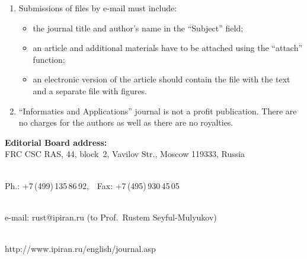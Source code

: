 {\begin{enumerate}[1.]
\item Submissions of files by e-mail must include:\\[-13.5pt]
\begin{itemize}
\item   the journal title and author's name in the ``Subject'' field; \\[-13.5pt]
\item   an article and additional materials have to be attached using the ``attach'' function;\\[-13.5pt]
\item   an electronic version of the article should contain the file with the text and a separate file
with figures.\\[-13.5pt]
\end{itemize}

\item ``Informatics and Applications'' journal is not a profit publication. There are no
charges for the authors as well as there are no royalties.\\[-13.5pt]
\end{enumerate}

\def\leftfootline{\small{\textbf{\thepage}
\hfill INFORMATIKA I EE PRIMENENIYA~--- INFORMATICS AND APPLICATIONS\ \ \ 2018\
\ \ volume~12\ \ \ issue\ 4}
}%
 \def\rightfootline{\small{INFORMATIKA I EE PRIMENENIYA~--- INFORMATICS AND APPLICATIONS\ \ \ 2018\ \ \ volume~12\ \ \ issue\ 4
\hfill \textbf{\thepage}}}

\def\leftkol{Requirements for manuscripts submitted to Journal
``Informatics~and~Applications''}

\def\rightkol{Requirements for manuscripts submitted to Journal
``Informatics~and~Applications''}




\begin{center}
\textbf{Editorial Board address:} \\




FRC CSC RAS, 44, block~2, Vavilov Str., Moscow 119333, Russia\\[-10pt]

\

Ph.: +7\,(499)\,135\,86\,92,\ \ Fax: +7\,(495)\,930\,45\,05\\[-10pt]

\

 e-mail: {\sf rust@ipiran.ru} (to Prof.\ Rustem Seyful-Mulyukov)\\[-10pt]

\

 {\sf http://www.ipiran.ru/english/journal.asp}
\end{center}
 }

